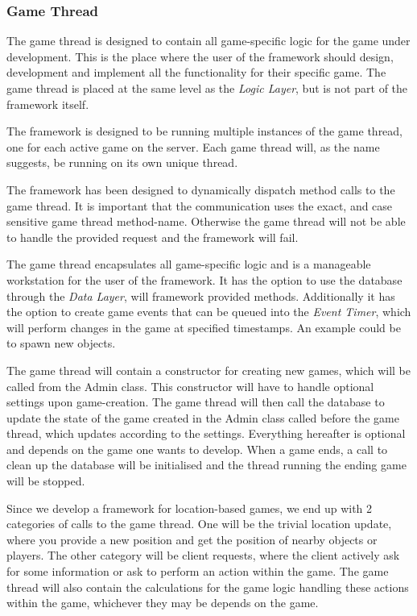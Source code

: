 \subsubsection{Game Thread}\label{designgamethread}
The game thread is designed to contain all game-specific logic for the game under development. This is the place where the user of the framework should design, development and implement all the functionality for their specific game. The game thread is placed at the same level as the \textit{Logic Layer}, but is not part of the framework itself. 

The framework is designed to be running multiple instances of the game thread, one for each active game on the server. Each game thread will, as the name suggests, be running on its own unique thread. 

The framework has been designed to dynamically dispatch method calls to the game thread. It is important that the communication uses the exact, and case sensitive game thread method-name. Otherwise the game thread will not be able to handle the provided request and the framework will fail. 

The game thread encapsulates all game-specific logic and is a manageable workstation for the user of the framework. It has the option to use the database through the \textit{Data Layer}, will framework provided methods. Additionally it has the option to create game events that can be queued into the \textit{Event Timer}, which will perform changes in the game at specified timestamps. An example could be to spawn new objects.

The game thread will contain a constructor for creating new games, which will be called from the Admin class. This constructor will have to handle optional settings upon game-creation. The game thread will then call the database to update the state of the game created in the Admin class called before the game thread, which updates according to the settings. Everything hereafter is optional and depends on the game one wants to develop. When a game ends, a call to clean up the database will be initialised and the thread running the ending game will be stopped.

Since we develop a framework for location-based games, we end up with 2 categories of calls to the game thread. One will be the trivial location update, where you provide a new position and get the position of nearby objects or players. The other category will be client requests, where the client actively ask for some information or ask to perform an action within the game. The game thread will also contain the calculations for the game logic handling these actions within the game, whichever they may be depends on the game. 